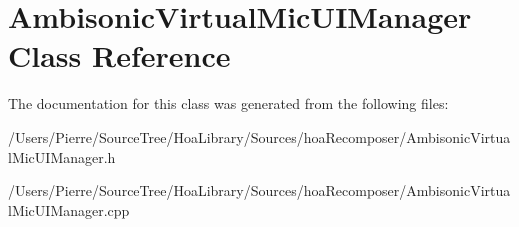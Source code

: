 \hypertarget{class_ambisonic_virtual_mic_u_i_manager}{\section{Ambisonic\-Virtual\-Mic\-U\-I\-Manager Class Reference}
\label{class_ambisonic_virtual_mic_u_i_manager}
}


The documentation for this class was generated from the following files\-:\begin{DoxyCompactItemize}
\item 
/\-Users/\-Pierre/\-Source\-Tree/\-Hoa\-Library/\-Sources/hoa\-Recomposer/Ambisonic\-Virtual\-Mic\-U\-I\-Manager.\-h\item 
/\-Users/\-Pierre/\-Source\-Tree/\-Hoa\-Library/\-Sources/hoa\-Recomposer/Ambisonic\-Virtual\-Mic\-U\-I\-Manager.\-cpp\end{DoxyCompactItemize}
